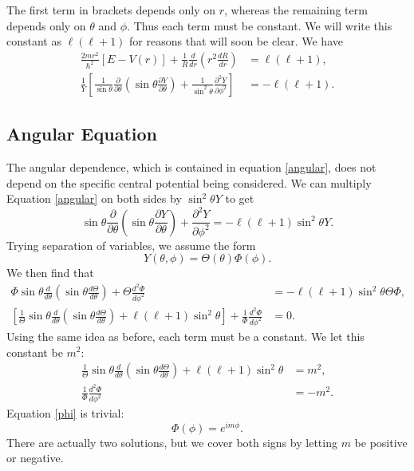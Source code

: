 The first term in brackets depends only on $r$, whereas the remaining term depends only on $\theta$ and $\phi$. Thus each term must be constant. We will write this constant as $\ell (\ell+1)$ for reasons that will soon be clear. We have 
\begin{align}
    \frac{2mr^2}{\hbar^2} [E-V(r)] + \frac{1}{R} \frac{d}{dr} \left(r^2 \frac{dR}{dr} \right) &= \ell(\ell+1),\label{radial1}\\
    \frac{1}{Y}\left[\frac{1}{\sin \theta} \frac{\partial}{\partial \theta} \left( \sin \theta \frac{\partial Y}{\partial \theta}\right)+\frac{1}{\sin^2 \theta} \frac{\partial^2 Y}{\partial \phi^2} \right] &= -\ell(\ell+1).\label{angular}
\end{align}
\subsection{Angular Equation}
\label{angeqn}
The angular dependence, which is contained in equation \ref{angular}, does not depend on the specific central potential being considered. 
We can multiply Equation \ref{angular} on both sides by $\sin^2 \theta Y$ to get 
\begin{equation}
    {\sin \theta} \frac{\partial}{\partial \theta} \left( \sin \theta \frac{\partial Y}{\partial \theta}\right)+ \frac{\partial^2 Y}{\partial \phi^2}  = -\ell(\ell+1)\sin^2 \theta Y.
\end{equation}
Trying separation of variables, we assume the form \begin{equation*}
    Y(\theta, \phi) = \Theta (\theta) \Phi (\phi).
    \end{equation*}
We then find that 
\begin{align*}
 \Phi \sin \theta \frac{d}{d\theta} \left(\sin\theta \frac{d\Theta}{d\theta} \right) + \Theta \frac{d^2 \Phi}{d\phi^2}&= -\ell (\ell+1) \sin^2 \theta \Theta \Phi,\\
 \left[\frac{1}{\Theta} \sin \theta \frac{d}{d\theta}\left(\sin \theta \frac{d\Theta}{d\theta} \right) + \ell(\ell+1) \sin^2 \theta \right] + \frac{1}{\Phi}\frac{d^2 \Phi}{d\phi^2} &= 0.
\end{align*}
Using the same idea as before, each term must be a constant. We let this constant be $m^2$:
\begin{align}
    \frac{1}{\Theta} \sin \theta \frac{d}{d\theta}\left(\sin \theta \frac{d\Theta}{d\theta} \right) + \ell(\ell+1) \sin^2 \theta &= m^2,\label{theta} \\
    \frac{1}{\Phi} \frac{d^2 \Phi}{d\phi^2} &= -m^2. \label{phi}
\end{align}
Equation \ref{phi} is trivial:
\begin{equation}
    \Phi(\phi) = e^{im\phi}.
\end{equation}
There are actually two solutions, but we cover both signs by letting $m$ be positive or negative.

